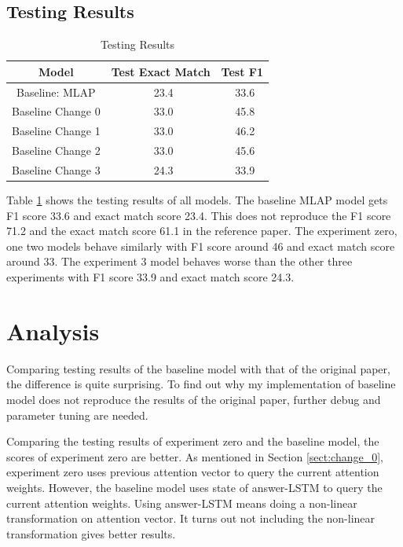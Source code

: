 \documentclass[modernstyle,12pt]{sjsuthesis}
\theoremstyle{definition}
\begin{document}
\subsection{Testing Results}

\begin{table}[htbp]\centering
  \caption{Testing Results}
  \label{tab:test_results}
  \begin{tabular}{|c|c|c|}
    \hline
    Model& Test Exact Match & Test F1 \\
    \hline\hline
    Baseline: MLAP & \ 23.4 &\ 33.6 \\
    Baseline Change 0& \ 33.0 &\ 45.8 \\
    Baseline Change 1 & \ 33.0 &\ 46.2 \\
    Baseline Change 2 & \ 33.0 &\ 45.6 \\
    Baseline Change 3 & \ 24.3 &\ 33.9 \\
    \hline
  \end{tabular}
\end{table}

Table \ref{tab:test_results} shows the testing results of all models. The baseline MLAP model gets F1 score 33.6 and exact match score 23.4. This does not reproduce the F1 score 71.2 and the exact match score 61.1 in the reference paper\cite{wang2016machine}. The experiment zero, one two models behave similarly with F1 score around 46 and exact match score around 33. The experiment 3 model behaves worse than the other three experiments with F1 score 33.9 and exact match score 24.3.




\section{Analysis}

Comparing testing results of the baseline model with that of the original paper, the difference is quite surprising. To find out why my implementation of baseline model does not reproduce the results of the original paper, further debug and parameter tuning are needed.

Comparing the testing results of experiment zero and the baseline model, the scores of experiment zero are better. As mentioned in Section \ref{sect:change_0}, experiment zero uses previous attention vector to query the current attention weights. However, the baseline model uses state of answer-LSTM to query the current attention weights. Using answer-LSTM means doing a non-linear transformation on attention vector. It turns out not including the non-linear transformation gives better results.
\end{document}
